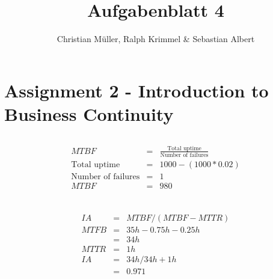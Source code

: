 \documentclass{article}
\title{Aufgabenblatt 4}
\author{Christian Müller, Ralph Krimmel \& Sebastian Albert }
\begin{document}
\maketitle

\section*{Assignment 2 - Introduction to Business Continuity}

\subsection{}
\begin{eqnarray*} 
	MTBF &=& \frac{\text{Total uptime}}{\text{Number of failures}}  \\
	\text{Total uptime} &=& 1000 - (1000*0.02) \\
	\text{Number of failures} &=& 1 \\
	MTBF &=& 980 \\ 
\end{eqnarray*}

\subsection{}
\begin{eqnarray*}
	IA &=& MTBF/(MTBF-MTTR)\\
	MTFB &=& 35h-0.75h-0.25h \\
	&=& 34h \\
	MTTR &=& 1h \\
	IA &=& 34h/34h+1h \\
	&=& 0.971  \\
\end{eqnarray*}

\subsection{}


\subsection{}


\subsection{}
\end{document}
